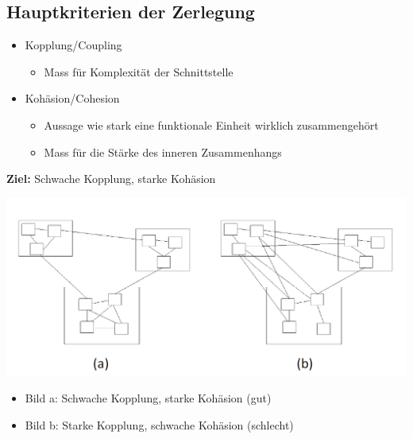 \subsection{Hauptkriterien der Zerlegung}
\begin{itemize}
  \item Kopplung/Coupling
  \begin{itemize}
    \item Mass für Komplexität der Schnittstelle
  \end{itemize}
  \item Kohäsion/Cohesion
  \begin{itemize}
    \item Aussage wie stark eine funktionale Einheit wirklich zusammengehört
    \item Mass für die Stärke des inneren Zusammenhangs
  \end{itemize}
\end{itemize}

\textbf{Ziel:} Schwache Kopplung, starke Kohäsion

\begin{multicols}{2}
\includegraphics[width=\linewidth]{images/Modularisierung/BeispieleKopplungKohaesion.png}
\vfill\null
\begin{itemize}
	\item Bild a: Schwache Kopplung, starke Kohäsion (gut)
	\item Bild b: Starke Kopplung, schwache Kohäsion (schlecht)
\end{itemize}
\vfill\null
\end{multicols}


